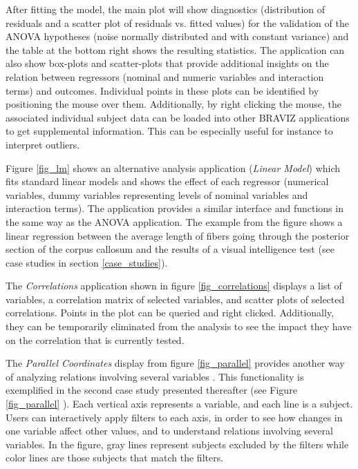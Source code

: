 \documentclass{frontiersHLTH}
\begin{document}
After fitting the model, the main plot will show diagnostics (distribution of residuals and a scatter plot of residuals vs. fitted values) for the validation of the ANOVA hypotheses (noise normally distributed and with constant variance) and the table at the bottom right shows the resulting statistics. The application can also show box-plots and scatter-plots that provide additional insights on the relation between regressors (nominal and numeric variables and interaction terms) and outcomes. Individual points in these plots can be identified by positioning the mouse over them. Additionally, by right clicking the mouse, the associated individual subject data can be loaded into other BRAVIZ applications to get supplemental information. This can be especially useful for instance to interpret outliers.

Figure \ref{fig_lm} shows an alternative analysis application (\emph{Linear Model}) which fits standard linear models and shows the effect of each regressor (numerical variables, dummy variables representing levels of nominal variables and interaction terms). The application provides a similar interface and functions in the same way as the ANOVA application. The example from the figure shows a linear regression between the average length of fibers going through the posterior section of the corpus callosum and the results of a visual intelligence test (see case studies in section \ref{case_studies}).  

The \emph{Correlations} application shown in figure \ref{fig_correlations} displays a list of variables, a correlation matrix of selected variables, and scatter plots of selected correlations. Points in the plot can be queried and right clicked. Additionally, they can be temporarily eliminated from the analysis to see the impact they have on the correlation that is currently tested. 

The \emph{Parallel Coordinates} display from figure \ref{fig_parallel} provides another way of analyzing relations involving several variables . This functionality is exemplified in the second case study presented thereafter (see Figure \ref{fig_parallel} ). Each vertical axis represents a variable, and each line is a subject. Users can interactively apply filters to each axis, in order to see how changes in one variable affect other values, and to understand relations involving several variables. In the figure, gray lines represent subjects excluded by the filters while color lines are those subjects that match the filters.
\end{document}
